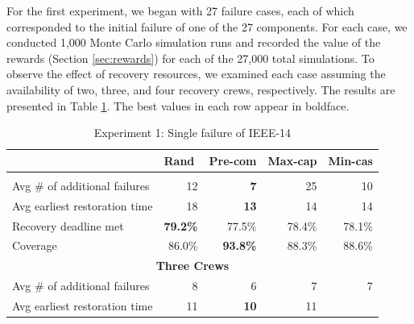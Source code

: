 \documentclass[conference]{IEEEtran}
\begin{document}
For the first experiment, we began with 27 failure cases, each of which corresponded to the initial failure of one of the 27 components. For each case, we conducted 1,000 Monte Carlo simulation runs and recorded the value of the rewards (Section \ref{sec:rewards}) for each of the 27,000 total simulations. To observe the effect of recovery resources, we examined each case assuming the availability of two, three, and four recovery crews, respectively. The results are presented in Table \ref{TB:single}. The best values in each row appear in boldface. 
\begin{table}
\centering
\caption{Experiment 1: Single failure of IEEE-14}
\label{TB:single}
\begin{tabular}{|lrrrr|}
\hline
\rowcolor[HTML]{D9D9D9} 
\multicolumn{1}{|l|}{\cellcolor[HTML]{D9D9D9}Recovery scheme} &
  \multicolumn{1}{l|}{\cellcolor[HTML]{D9D9D9}Rand} &
  \multicolumn{1}{l|}{\cellcolor[HTML]{D9D9D9}Pre-com} &
  \multicolumn{1}{l|}{\cellcolor[HTML]{D9D9D9}Max-cap} &
  \multicolumn{1}{l|}{\cellcolor[HTML]{D9D9D9}Min-cas} \\ \hline
\rowcolor[HTML]{FFFFFF} 
\multicolumn{5}{|c|}{\textbf{Two Crews}} \\ \hline
\multicolumn{1}{|l|}{\cellcolor[HTML]{D9D9D9}Avg \# of additional failures} &
  \multicolumn{1}{r|}{12} &
  \multicolumn{1}{r|}{\textbf{7}} &
  \multicolumn{1}{r|}{25} &
  10 \\ \hline
\multicolumn{1}{|l|}{\cellcolor[HTML]{D9D9D9}Avg earliest restoration time} &
  \multicolumn{1}{r|}{18} &
  \multicolumn{1}{r|}{\textbf{13}} &
  \multicolumn{1}{r|}{14} &
  14 \\ \hline
\multicolumn{1}{|l|}{\cellcolor[HTML]{D9D9D9}Recovery deadline met} &
  \multicolumn{1}{r|}{\textbf{79.2\%}} &
  \multicolumn{1}{r|}{77.5\%} &
  \multicolumn{1}{r|}{78.4\%} &
  78.1\% \\ \hline
\multicolumn{1}{|l|}{\cellcolor[HTML]{D9D9D9}Coverage} &
  \multicolumn{1}{r|}{86.0\%} &
  \multicolumn{1}{r|}{\textbf{93.8\%}} &
  \multicolumn{1}{r|}{88.3\%} &
  88.6\% \\ \hline
\multicolumn{5}{|c|}{\textbf{Three Crews}} \\ \hline
\multicolumn{1}{|l|}{\cellcolor[HTML]{D9D9D9}Avg \# of additional failures} &
  \multicolumn{1}{r|}{8} &
  \multicolumn{1}{r|}{6} &
  \multicolumn{1}{r|}{7} &
  7 \\ \hline
\multicolumn{1}{|l|}{\cellcolor[HTML]{D9D9D9}Avg earliest restoration time} &
  \multicolumn{1}{r|}{11} &
  \multicolumn{1}{r|}{\textbf{10}} &
  \multicolumn{1}{r|}{11} &

\end{tabular}
\end{table}
\end{document}

